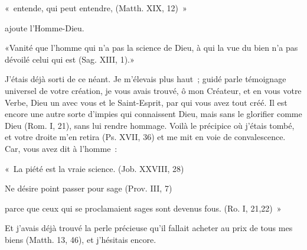 \documentclass[french,twoside]{book} %
\newenvironment{quoteblock}%
  {\begin{quoting}}
  {\end{quoting}}
\newenvironment{quotebar}{%
    \def\FrameCommand{{\color{rubric!10!}\vrule width 0.5em} \hspace{0.9em}}%
    \def\OuterFrameSep{\itemsep} %
    \MakeFramed {\advance\hsize-\width \FrameRestore}
  }%
  {%
    \endMakeFramed
  }
\renewenvironment{quoteblock}%
  {%
    \savenotes
    \setstretch{0.9}
    \normalfont
    \begin{quotebar}
  }
  {%
    \end{quotebar}
    \spewnotes
  }
\begin{document}
\begin{quoteblock}
\noindent « entende, qui peut entendre, (Matth. XIX, 12) »\end{quoteblock}

\noindent ajoute l’Homme-Dieu.\par

\begin{quoteblock}
\noindent «Vanité que l’homme qui n’a pas la science de Dieu, à qui la vue du bien n’a pas dévoilé celui qui est (Sag. XIII, 1).»\end{quoteblock}

\noindent J’étais déjà sorti de ce néant. Je m’élevais plus haut ; guidé parle témoignage universel de votre création, je vous avais trouvé, ô mon Créateur, et en vous votre Verbe, Dieu un avec vous et le Saint-Esprit, par qui vous avez tout créé. Il est encore une autre sorte d’impies qui connaissent Dieu, mais sans le glorifier comme Dieu (Rom. I, 21), sans lui rendre hommage. Voilà le   précipice où j’étais tombé, et votre droite m’en retira (Ps. XVII, 36) et me mit en voie de convalescence. Car, vous avez dit à l’homme :\par

\begin{quoteblock}
\noindent « La piété est la vraie science. (Job. XXVIII, 28)\end{quoteblock}


\begin{quoteblock}
\noindent Ne désire point passer pour sage (Prov. III, 7)\end{quoteblock}


\begin{quoteblock}
\noindent parce que ceux qui se proclamaient sages sont devenus fous. (Ro. I, 21,22) »\end{quoteblock}

\noindent Et j’avais déjà trouvé la perle précieuse qu’il fallait acheter au prix de tous mes biens (Matth. 13, 46), et j’hésitais encore.
\end{document}
